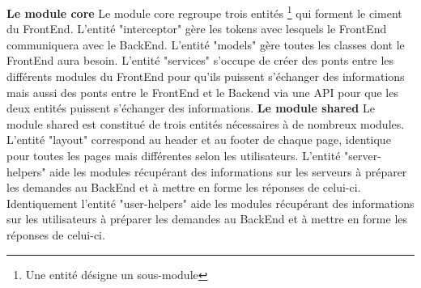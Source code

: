 \documentclass{article}
\begin{document}
\newpage
\textbf{Le module core}
\newline
\newline
Le module core regroupe trois entités \footnote{\label{entites} Une entité désigne un sous-module} qui forment le ciment du FrontEnd.
\newline
L'entité "interceptor" gère les tokens avec lesquels le FrontEnd communiquera avec le BackEnd.
\newline
L'entité "models" gère toutes les classes dont le FrontEnd aura besoin.
\newline
L'entité "services" s'occupe de créer des ponts entre les différents modules du FrontEnd pour qu'ils puissent s'échanger des informations mais aussi des ponts entre le FrontEnd et le Backend via une API pour que les deux entités puissent s'échanger des informations.
\newline
\newline
\textbf{Le module shared}
\newline
\newline
Le module shared est constitué de trois entités nécessaires à de nombreux modules.
\newline
L'entité "layout" correspond au header et au footer de chaque page, identique pour toutes les pages mais différentes selon les utilisateurs.
\newline
L'entité "server-helpers" aide les modules récupérant des informations sur les serveurs à préparer les demandes au BackEnd et à mettre en forme les réponses de celui-ci.
\newline
Identiquement l'entité "user-helpers" aide les modules récupérant des informations sur les utilisateurs à préparer les demandes au BackEnd et à mettre en forme les réponses de celui-ci.
\newpage
\end{document}
